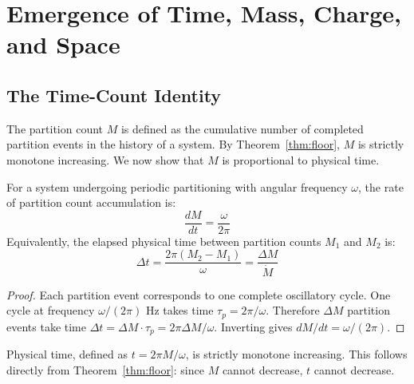 
\section{Emergence of Time, Mass, Charge, and Space}
\label{sec:emergence}

\subsection{The Time-Count Identity}
\label{subsec:time_count}

The partition count $M$ is defined as the cumulative number of completed
partition events in the history of a system. By Theorem~\ref{thm:floor}, $M$
is strictly monotone increasing. We now show that $M$ is proportional to
physical time.

\begin{theorem}
\label{thm:time_count}
For a system undergoing periodic partitioning with angular frequency $\omega$,
the rate of partition count accumulation is:
\begin{equation}
    \frac{dM}{dt} = \frac{\omega}{2\pi}
    \label{eq:time_count}
\end{equation}
Equivalently, the elapsed physical time between partition counts $M_1$ and
$M_2$ is:
\begin{equation}
    \Delta t = \frac{2\pi(M_2 - M_1)}{\omega} = \frac{\Delta M}{\dot{M}}
    \label{eq:time_from_count}
\end{equation}
\end{theorem}

\begin{proof}
Each partition event corresponds to one complete oscillatory cycle. One cycle
at frequency $\omega/(2\pi)$ Hz takes time $\tau_p = 2\pi/\omega$. Therefore
$\Delta M$ partition events take time $\Delta t = \Delta M \cdot \tau_p =
2\pi \Delta M / \omega$. Inverting gives $dM/dt = \omega/(2\pi)$.
\end{proof}

\begin{corollary}
\label{cor:time_mono}
Physical time, defined as $t = 2\pi M / \omega$, is strictly monotone
increasing. This follows directly from Theorem~\ref{thm:floor}: since $M$
cannot decrease, $t$ cannot decrease.
\end{corollary}


